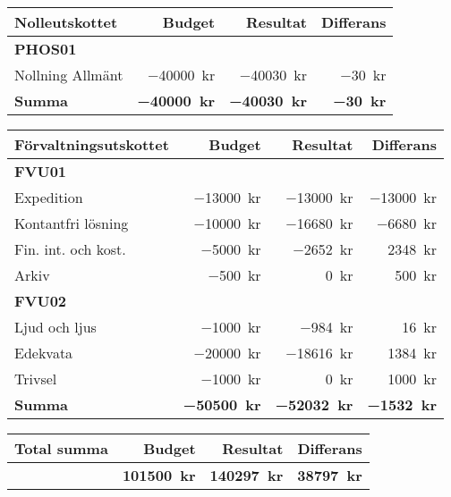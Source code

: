 \documentclass[../_main/handlingar.tex]{subfiles}
\begin{document}
\begin{tabularx}{12cm}{X r r r}
    \textbf{\large Nolleutskottet} & \textbf{Budget} & \textbf{Resultat} & \textbf{Differans} \\
    \hline
    \textbf{PHOS01} \\
    Nollning Allmänt & \SI{-40000}{kr} & \SI{-40030}{kr} & \SI{-30}{kr}\\
    \hline
    \textbf{Summa} & \textbf{\SI{-40000}{kr}} & \textbf{\SI{-40030}{kr}} & \textbf{\SI{-30}{kr}}\\
\end{tabularx}

\begin{tabularx}{12cm}{X r r r}
    \textbf{\large Förvaltningsutskottet} & \textbf{Budget} & \textbf{Resultat} & \textbf{Differans} \\
    \hline
    \textbf{FVU01} \\
    Expedition & \SI{-13000}{kr} & \SI{-13000}{kr} & \SI{-13000}{kr} \\
    Kontantfri lösning & \SI{-10000}{kr} & \SI{-16680}{kr} & \SI{-6680}{kr} \\
    Fin. int. och kost. & \SI{-5000}{kr} & \SI{-2652}{kr} & \SI{2348}{kr}  \\
    Arkiv & \SI{-500}{kr} & \SI{0}{kr} & \SI{500}{kr} \\
    \textbf{FVU02} \\
    Ljud och ljus & \SI{-1000}{kr} & \SI{-984}{kr} & \SI{16}{kr}\\
    Edekvata & \SI{-20000}{kr} & \SI{-18616}{kr} & \SI{1384}{kr}\\
    Trivsel & \SI{-1000}{kr} & \SI{0}{kr} & \SI{1000}{kr}\\
    \hline
    \textbf{Summa} & \textbf{\SI{-50500}{kr}} & \textbf{\SI{-52032}{kr}} & \textbf{\SI{-1532}{kr}}\\
\end{tabularx}

\begin{tabularx}{12cm}{X r r r}
    \textbf{\large Total summa} & \textbf{Budget} & \textbf{Resultat} & \textbf{Differans}\\
    \hline
     & \textbf{\SI{101500}{kr}} & \textbf{\SI{140297}{kr}} & \textbf{\SI{38797}{kr}} \\
\end{tabularx}

\newpage
\end{document}

